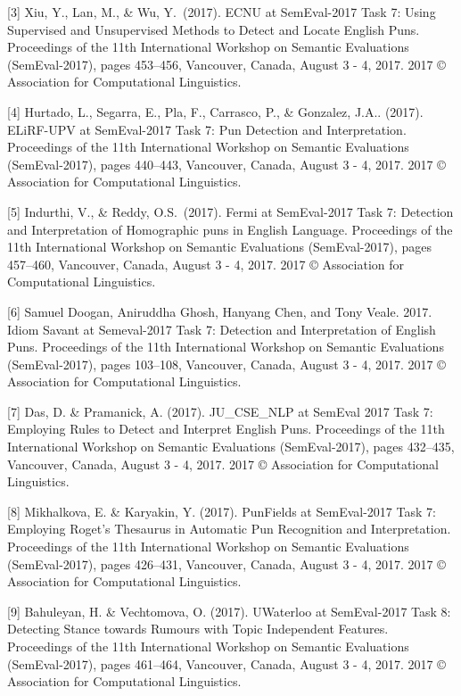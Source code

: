 \documentclass{article}
\begin{document}
[3] Xiu, Y., Lan, M., \& Wu, Y.\ (2017). ECNU at SemEval-2017 Task 7: Using
Supervised and Unsupervised Methods to Detect and Locate English Puns.
Proceedings of the 11th International Workshop on Semantic Evaluations
(SemEval-2017), pages 453–456, Vancouver, Canada, August 3 - 4, 2017. 2017 ©
Association for Computational Linguistics.

[4] Hurtado, L., Segarra, E., Pla, F., Carrasco, P., \& Gonzalez, J.A..
(2017). ELiRF-UPV at SemEval-2017 Task 7: Pun Detection and Interpretation.
Proceedings of the 11th International Workshop on Semantic Evaluations
(SemEval-2017), pages 440–443, Vancouver, Canada, August 3 - 4,
2017. 2017 © Association for Computational Linguistics.

[5] Indurthi, V., \&  Reddy, O.S.\ (2017). Fermi at SemEval-2017 Task
7: Detection and Interpretation of Homographic puns in English Language.
Proceedings of the 11th International Workshop on Semantic Evaluations
(SemEval-2017), pages 457–460, Vancouver, Canada, August 3 - 4, 2017. 2017 ©
Association for Computational Linguistics.

[6] Samuel Doogan, Aniruddha Ghosh, Hanyang Chen, and Tony Veale. 2017. Idiom
Savant at Semeval-2017 Task 7: Detection and Interpretation of English Puns.
Proceedings of the 11th International Workshop on Semantic Evaluations
(SemEval-2017), pages 103–108, Vancouver, Canada, August 3 - 4, 2017. 2017 ©
Association for Computational Linguistics.

[7] Das, D. \& Pramanick, A. (2017). JU\_CSE\_NLP at SemEval 2017 Task 7:
Employing Rules to Detect and Interpret English Puns. Proceedings of the 11th
International Workshop on Semantic Evaluations (SemEval-2017), pages 432–435,
Vancouver, Canada, August 3 - 4, 2017. 2017 © Association for Computational
Linguistics.

[8] Mikhalkova, E. \& Karyakin, Y. (2017). PunFields at SemEval-2017 Task 7:
Employing Roget’s Thesaurus in Automatic Pun Recognition and Interpretation.
Proceedings of the 11th International Workshop on Semantic Evaluations
(SemEval-2017), pages 426–431, Vancouver, Canada, August 3 - 4, 2017. 2017 ©
Association for Computational Linguistics.

[9] Bahuleyan, H. \& Vechtomova, O. (2017). UWaterloo at SemEval-2017 Task 8:
Detecting Stance towards Rumours with Topic Independent Features. Proceedings
of the 11th International Workshop on Semantic Evaluations (SemEval-2017),
pages 461–464, Vancouver, Canada, August 3 - 4, 2017. 2017 © Association for
Computational Linguistics.
\end{document}

